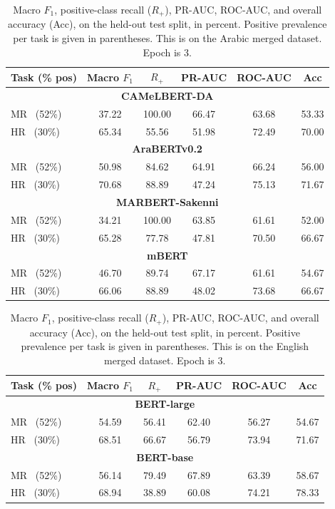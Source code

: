 \begin{table}[!htbp]
\centering
\caption{Macro $F_1$, positive-class recall ($R_{+}$), PR-AUC, ROC-AUC,
and overall accuracy (Acc), on the held-out test split, in percent. Positive prevalence
per task is given in parentheses. This is on the Arabic merged dataset. Epoch is 3.}
\label{tab:bert-results-merged-ar-ep3}
\setlength{\tabcolsep}{5pt}
\small
\begin{tabular}{l ccccc}
\toprule
Task (\% pos) & Macro $F_1$ & $R_{+}$ & PR-AUC & ROC-AUC & Acc \\
\midrule
\multicolumn{6}{c}{\textbf{CAMeLBERT-DA}} \\
\midrule
MR \ (52\%) & 37.22 & 100.00 & 66.47 & 63.68 & 53.33 \\
HR \ (30\%) & 65.34 & 55.56 & 51.98 & 72.49 & 70.00 \\
\midrule
\midrule
\multicolumn{6}{c}{\textbf{AraBERTv0.2}} \\
\midrule
MR \ (52\%) & 50.98 & 84.62 & 64.91 & 66.24 & 56.00 \\
HR \ (30\%) & 70.68 & 88.89 & 47.24 & 75.13 & 71.67 \\
\midrule
\midrule
\multicolumn{6}{c}{\textbf{MARBERT-Sakenni}} \\
\midrule
MR \ (52\%) & 34.21 & 100.00 & 63.85 & 61.61 & 52.00 \\
HR \ (30\%) & 65.28 & 77.78 & 47.81 & 70.50 & 66.67 \\
\midrule
\midrule
\multicolumn{6}{c}{\textbf{mBERT}} \\
\midrule
MR \ (52\%) & 46.70 & 89.74 & 67.17 & 61.61 & 54.67 \\
HR \ (30\%) & 66.06 & 88.89 & 48.02 & 73.68 & 66.67 \\
\bottomrule
\end{tabular}
\end{table}

\begin{table}[!htbp]
\centering
\caption{Macro $F_1$, positive-class recall ($R_{+}$), PR-AUC, ROC-AUC,
and overall accuracy (Acc), on the held-out test split, in percent. Positive prevalence
per task is given in parentheses. This is on the English merged dataset. Epoch is 3.}
\label{tab:bert-results-merged-en-ep3}
\setlength{\tabcolsep}{5pt}
\small
\begin{tabular}{l ccccc}
\toprule
Task (\% pos) & Macro $F_1$ & $R_{+}$ & PR-AUC & ROC-AUC & Acc \\
\midrule
\multicolumn{6}{c}{\textbf{BERT-large}} \\
\midrule
MR \ (52\%) & 54.59 & 56.41 & 62.40 & 56.27 & 54.67 \\
HR \ (30\%) & 68.51 & 66.67 & 56.79 & 73.94 & 71.67 \\
\midrule
\midrule
\multicolumn{6}{c}{\textbf{BERT-base}} \\
\midrule
MR \ (52\%) & 56.14 & 79.49 & 67.89 & 63.39 & 58.67 \\
HR \ (30\%) & 68.94 & 38.89 & 60.08 & 74.21 & 78.33 \\
\bottomrule
\end{tabular}
\end{table}

